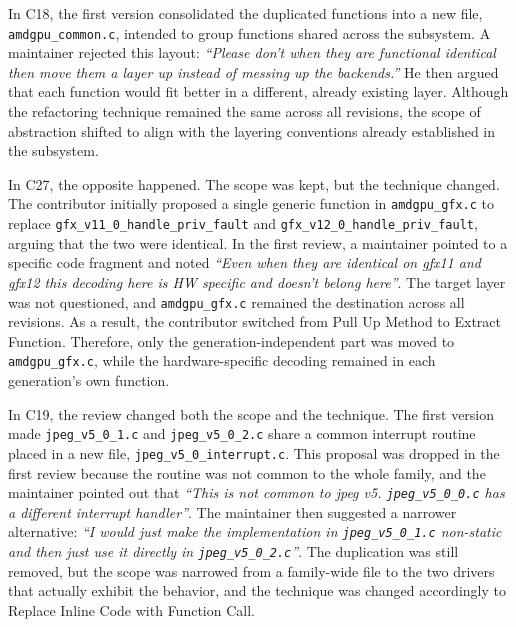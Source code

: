 \documentclass[10pt,conference]{IEEEtran}
\begin{document}
In C18, the first version consolidated the duplicated functions into a new file, \texttt{amdgpu\_common.c}, intended to group functions shared across the subsystem. A maintainer rejected this layout: \textit{``Please don't when they are functional identical then move them a layer up instead of messing up the backends.''} He then argued that each function would fit better in a different, already existing layer. Although the refactoring technique remained the same across all revisions, the scope of abstraction shifted to align with the layering conventions already established in the subsystem.

In C27, the opposite happened. The scope was kept, but the technique changed. The contributor initially proposed a single generic function in \texttt{amdgpu\_gfx.c} to replace \texttt{gfx\_v11\_0\_handle\_priv\_fault} and \texttt{gfx\_v12\_0\_handle\_priv\_fault}, arguing that the two were identical. In the first review, a maintainer pointed to a specific code fragment and noted \textit{``Even when they are identical on gfx11 and gfx12 this decoding here is HW specific and doesn't belong here''}. The target layer was not questioned, and \texttt{amdgpu\_gfx.c} remained the destination across all revisions. As a result, the contributor switched from Pull Up Method to Extract Function. Therefore, only the generation-independent part was moved to \texttt{amdgpu\_gfx.c}, while the hardware-specific decoding remained in each generation's own function.

In C19, the review changed both the scope and the technique. The first version made \texttt{jpeg\_v5\_0\_1.c} and \texttt{jpeg\_v5\_0\_2.c} share a common interrupt routine placed in a new file, \texttt{jpeg\_v5\_0\_interrupt.c}. This proposal was dropped in the first review because the routine was not common to the whole family, and the maintainer pointed out that \textit{``This is not common to jpeg v5.  \texttt{jpeg\_v5\_0\_0.c} has a different interrupt handler''}. The maintainer then suggested a narrower alternative: \textit{``I would just make the implementation in \texttt{jpeg\_v5\_0\_1.c} non-static and then just use it directly in \texttt{jpeg\_v5\_0\_2.c}''}. The duplication was still removed, but the scope was narrowed from a family-wide file to the two drivers that actually exhibit the behavior, and the technique was changed accordingly to Replace Inline Code with Function Call.
\end{document}

